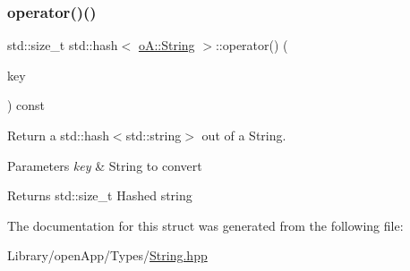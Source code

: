 \subsubsection{\texorpdfstring{operator()()}{operator()()}}
{\footnotesize\ttfamily std\+::size\+\_\+t std\+::hash$<$ \mbox{\hyperlink{classo_a_1_1_string}{o\+A\+::\+String}} $>$\+::operator() (\begin{DoxyParamCaption}\item[{const \mbox{\hyperlink{classo_a_1_1_string}{o\+A\+::\+String}} \&}]{key }\end{DoxyParamCaption}) const\hspace{0.3cm}{\ttfamily [inline]}}



Return a std\+::hash$<$std\+::string$>$ out of a String. 


\begin{DoxyParams}{Parameters}
{\em key} & String to convert \\
\hline
\end{DoxyParams}
\begin{DoxyReturn}{Returns}
std\+::size\+\_\+t Hashed string 
\end{DoxyReturn}


The documentation for this struct was generated from the following file\+:\begin{DoxyCompactItemize}
\item 
Library/open\+App/\+Types/\mbox{\hyperlink{_string_8hpp}{String.\+hpp}}\end{DoxyCompactItemize}
